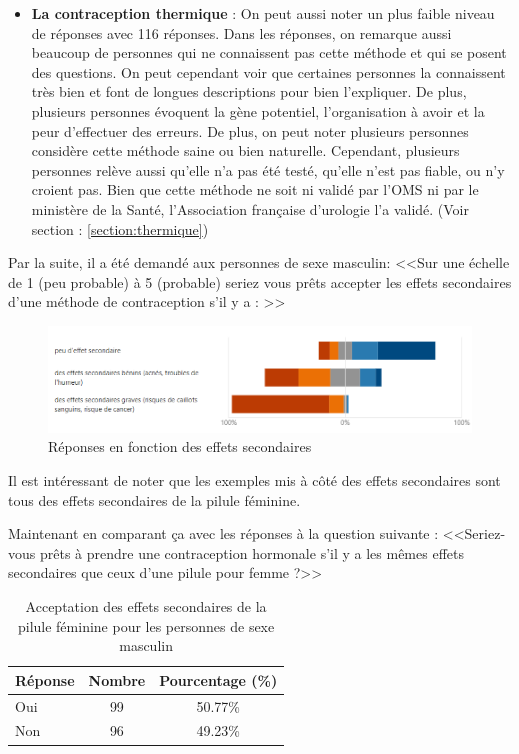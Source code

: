 \documentclass[12pt,a4paper]{report}
\begin{document}
\begin{itemize}
    \item \textbf{La contraception thermique} : On peut aussi noter un plus faible niveau de réponses avec 116 réponses. Dans les réponses, on remarque aussi beaucoup de personnes qui ne connaissent pas cette méthode et qui se posent des questions. On peut cependant voir que certaines personnes la connaissent très bien et font de longues descriptions pour bien l'expliquer. De plus, plusieurs personnes évoquent la gène potentiel, l'organisation à avoir et la peur d'effectuer des erreurs. De plus, on peut noter plusieurs personnes considère cette méthode saine ou bien naturelle. Cependant, plusieurs personnes relève aussi qu'elle n'a pas été testé, qu'elle n'est pas fiable, ou n'y croient pas. Bien que cette méthode ne soit ni validé par l'OMS ni par le ministère de la Santé, l'Association française d'urologie l'a validé. (Voir section : \ref{section:thermique})
    
\end{itemize}

Par la suite, il a été demandé aux personnes de sexe masculin: <<Sur une échelle de 1 (peu probable) à 5 (probable) seriez vous prêts accepter les effets secondaires d'une méthode de contraception s'il y a : >>

\begin{figure}[H]
    \centering
    \includegraphics[width=1\textwidth]{images/questionnaire/Acceptation effets secondaires.png}
    \caption{Réponses en fonction des effets secondaires}
    \label{fig:reponse_effets_secondaires}
\end{figure}

Il est intéressant de noter que les exemples mis à côté des effets secondaires sont tous des effets secondaires de la pilule féminine.

Maintenant en comparant ça avec les réponses à la question suivante : <<Seriez-vous prêts à prendre une contraception hormonale s'il y a les mêmes effets secondaires que ceux d'une pilule pour femme ?>>

\begin{table}[H]
\centering
\begin{tabular}{|l|c|c|}
\hline
\textbf{Réponse} & \textbf{Nombre} & \textbf{Pourcentage (\%)} \\
\hline
Oui & 99 & 50.77\% \\
Non & 96 & 49.23\% \\
\hline
\end{tabular}
\caption{Acceptation des effets secondaires de la pilule féminine pour les personnes de sexe masculin}
\end{table}
\end{document}
